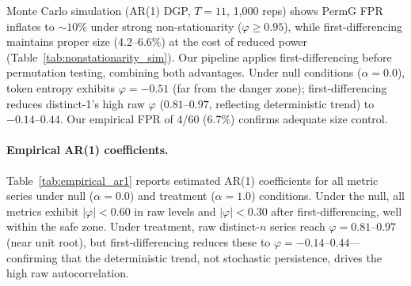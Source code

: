 Monte Carlo simulation (AR(1) DGP, $T{=}11$, 1{,}000 reps) shows PermG FPR inflates to ${\sim}10\%$ under strong non-stationarity ($\varphi{\geq}0.95$), while first-differencing maintains proper size ($4.2$--$6.6\%$) at the cost of reduced power (Table~\ref{tab:nonstationarity_sim}).
Our pipeline applies first-differencing before permutation testing, combining both advantages.
Under null conditions ($\alpha{=}0.0$), token entropy exhibits $\varphi{=}-0.51$ (far from the danger zone); first-differencing reduces distinct-1's high raw $\varphi$ ($0.81$--$0.97$, reflecting deterministic trend) to $-0.14$--$0.44$.
Our empirical FPR of 4/60 (6.7\%) confirms adequate size control.

\begin{table}[H]
\centering
\small
\caption{Size and power under AR(1) DGP ($T{=}11$, 1{,}000 reps). First-differencing maintains nominal size; PermG FPR inflates at $\varphi{\geq}0.95$.}
\label{tab:nonstationarity_sim}
\end{table}

\paragraph{Empirical AR(1) coefficients.}
Table~\ref{tab:empirical_ar1} reports estimated AR(1) coefficients for all metric series under null ($\alpha{=}0.0$) and treatment ($\alpha{=}1.0$) conditions.
Under the null, all metrics exhibit $|\varphi| < 0.60$ in raw levels and $|\varphi| < 0.30$ after first-differencing, well within the safe zone.
Under treatment, raw distinct-$n$ series reach $\varphi{=}0.81$--$0.97$ (near unit root), but first-differencing reduces these to $\varphi{=}-0.14$--$0.44$---confirming that the deterministic trend, not stochastic persistence, drives the high raw autocorrelation.

